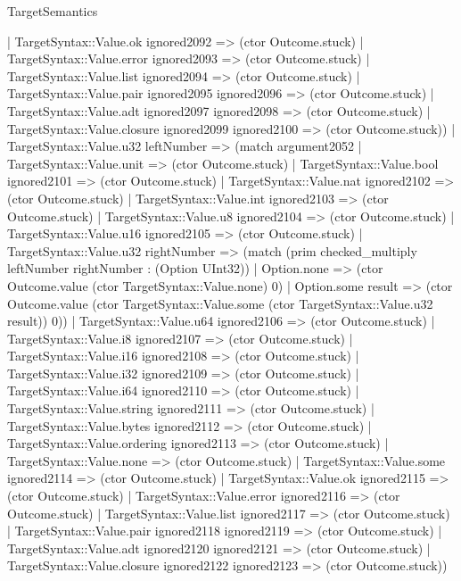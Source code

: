 \begin{lexlean}{TargetSemantics}
\begin{semanticmodule}
{              | TargetSyntax::Value.ok ignored2092 => (ctor Outcome.stuck)
              | TargetSyntax::Value.error ignored2093 => (ctor Outcome.stuck)
              | TargetSyntax::Value.list ignored2094 => (ctor Outcome.stuck)
              | TargetSyntax::Value.pair ignored2095 ignored2096 => (ctor Outcome.stuck)
              | TargetSyntax::Value.adt ignored2097 ignored2098 => (ctor Outcome.stuck)
              | TargetSyntax::Value.closure ignored2099 ignored2100 => (ctor Outcome.stuck))
            | TargetSyntax::Value.u32 leftNumber => (match argument2052
              | TargetSyntax::Value.unit => (ctor Outcome.stuck)
              | TargetSyntax::Value.bool ignored2101 => (ctor Outcome.stuck)
              | TargetSyntax::Value.nat ignored2102 => (ctor Outcome.stuck)
              | TargetSyntax::Value.int ignored2103 => (ctor Outcome.stuck)
              | TargetSyntax::Value.u8 ignored2104 => (ctor Outcome.stuck)
              | TargetSyntax::Value.u16 ignored2105 => (ctor Outcome.stuck)
              | TargetSyntax::Value.u32 rightNumber => (match (prim checked_multiply leftNumber rightNumber : (Option UInt32))
                | Option.none => (ctor Outcome.value (ctor TargetSyntax::Value.none) 0)
                | Option.some result => (ctor Outcome.value (ctor TargetSyntax::Value.some (ctor TargetSyntax::Value.u32 result)) 0))
              | TargetSyntax::Value.u64 ignored2106 => (ctor Outcome.stuck)
              | TargetSyntax::Value.i8 ignored2107 => (ctor Outcome.stuck)
              | TargetSyntax::Value.i16 ignored2108 => (ctor Outcome.stuck)
              | TargetSyntax::Value.i32 ignored2109 => (ctor Outcome.stuck)
              | TargetSyntax::Value.i64 ignored2110 => (ctor Outcome.stuck)
              | TargetSyntax::Value.string ignored2111 => (ctor Outcome.stuck)
              | TargetSyntax::Value.bytes ignored2112 => (ctor Outcome.stuck)
              | TargetSyntax::Value.ordering ignored2113 => (ctor Outcome.stuck)
              | TargetSyntax::Value.none => (ctor Outcome.stuck)
              | TargetSyntax::Value.some ignored2114 => (ctor Outcome.stuck)
              | TargetSyntax::Value.ok ignored2115 => (ctor Outcome.stuck)
              | TargetSyntax::Value.error ignored2116 => (ctor Outcome.stuck)
              | TargetSyntax::Value.list ignored2117 => (ctor Outcome.stuck)
              | TargetSyntax::Value.pair ignored2118 ignored2119 => (ctor Outcome.stuck)
              | TargetSyntax::Value.adt ignored2120 ignored2121 => (ctor Outcome.stuck)
              | TargetSyntax::Value.closure ignored2122 ignored2123 => (ctor Outcome.stuck))
}
\end{semanticmodule}
\end{lexlean}
